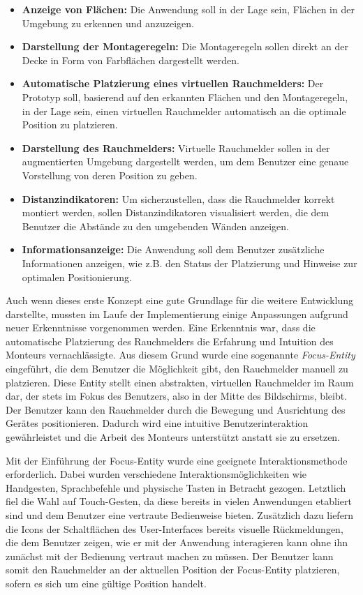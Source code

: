 \begin{itemize}
    \item \textbf{Anzeige von Flächen:} Die Anwendung soll in der Lage sein, Flächen in der Umgebung zu erkennen und anzuzeigen.
    \item \textbf{Darstellung der Montageregeln:} Die Montageregeln sollen direkt an der Decke in Form von Farbflächen dargestellt werden.
    \item \textbf{Automatische Platzierung eines virtuellen Rauchmelders:} Der Prototyp soll, basierend auf den erkannten Flächen und den Montageregeln, in der Lage sein, einen virtuellen Rauchmelder automatisch an die optimale Position zu platzieren.
    \item \textbf{Darstellung des Rauchmelders:} Virtuelle Rauchmelder sollen in der augmentierten Umgebung dargestellt werden, um dem Benutzer eine genaue Vorstellung von deren Position zu geben.
    \item \textbf{Distanzindikatoren:} Um sicherzustellen, dass die Rauchmelder korrekt montiert werden, sollen Distanzindikatoren visualisiert werden, die dem Benutzer die Abstände zu den umgebenden Wänden anzeigen.
    \item \textbf{Informationsanzeige:} Die Anwendung soll dem Benutzer zusätzliche Informationen anzeigen, wie z.B. den Status der Platzierung und Hinweise zur optimalen Positionierung.
\end{itemize}

Auch wenn dieses erste Konzept eine gute Grundlage für die weitere Entwicklung darstellte, mussten im Laufe der Implementierung einige Anpassungen aufgrund neuer Erkenntnisse vorgenommen werden. Eine Erkenntnis war, dass die automatische Platzierung des Rauchmelders die Erfahrung und Intuition des Monteurs vernachlässigte. Aus diesem Grund wurde eine sogenannte \emph{Focus-Entity} eingeführt, die dem Benutzer die Möglichkeit gibt, den Rauchmelder manuell zu platzieren. Diese Entity stellt einen abstrakten, virtuellen Rauchmelder im Raum dar, der stets im Fokus des Benutzers, also in der Mitte des Bildschirms, bleibt. Der Benutzer kann den Rauchmelder durch die Bewegung und Ausrichtung des Gerätes positionieren. Dadurch wird eine intuitive Benutzerinteraktion gewährleistet und die Arbeit des Monteurs unterstützt anstatt sie zu ersetzen.

Mit der Einführung der Focus-Entity wurde eine geeignete Interaktionsmethode erforderlich. Dabei wurden verschiedene Interaktionsmöglichkeiten wie Handgesten, Sprachbefehle und physische Tasten in Betracht gezogen. Letztlich fiel die Wahl auf Touch-Gesten, da diese bereits in vielen Anwendungen etabliert sind und dem Benutzer eine vertraute Bedienweise bieten. Zusätzlich dazu liefern die Icons der Schaltflächen des User-Interfaces bereits visuelle Rückmeldungen, die dem Benutzer zeigen, wie er mit der Anwendung interagieren kann ohne ihn zunächst mit der Bedienung vertraut machen zu müssen. Der Benutzer kann somit den Rauchmelder an der aktuellen Position der Focus-Entity platzieren, sofern es sich um eine gültige Position handelt.

